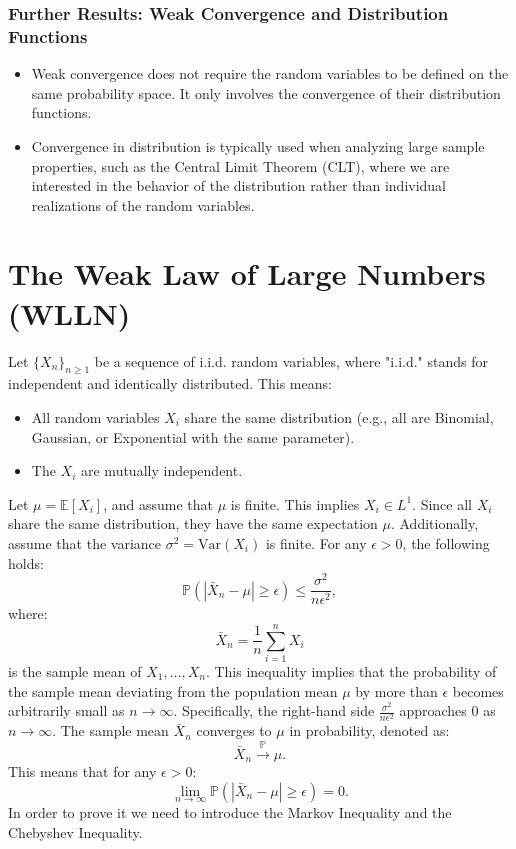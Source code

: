 \subsubsection{Further Results: Weak Convergence and Distribution Functions}

\begin{itemize}
    \item Weak convergence does not require the random variables to be defined on the same probability space. It only involves the convergence of their distribution functions.
    \item Convergence in distribution is typically used when analyzing large sample properties, such as the Central Limit Theorem (CLT), where we are interested in the behavior of the distribution rather than individual realizations of the random variables.
\end{itemize}


\section{The Weak Law of Large Numbers (WLLN)}
Let \( \{X_n\}_{n \geq 1} \) be a sequence of i.i.d. random variables, where "i.i.d." stands for independent and identically distributed. This means:
\begin{itemize}
    \item All random variables \( X_i \) share the same distribution (e.g., all are Binomial, Gaussian, or Exponential with the same parameter).
    \item The \( X_i \) are mutually independent.
\end{itemize}
Let \( \mu = \mathbb{E}[X_i] \), and assume that \( \mu \) is finite. This implies \( X_i \in L^1 \). Since all \( X_i \) share the same distribution, they have the same expectation \( \mu \). Additionally, assume that the variance \( \sigma^2 = \mathrm{Var}(X_i) \) is finite. For any \( \epsilon > 0 \), the following holds:
\[
\mathbb{P}(|\bar{X}_n - \mu| \geq \epsilon) \leq \frac{\sigma^2}{n \epsilon^2},
\]
where:
\[
\bar{X}_n = \frac{1}{n} \sum_{i=1}^n X_i
\]
is the sample mean of \( X_1, \dots, X_n \). \newline
This inequality implies that the probability of the sample mean deviating from the population mean \( \mu \) by more than \( \epsilon \) becomes arbitrarily small as \( n \to \infty \). Specifically, the right-hand side \( \frac{\sigma^2}{n \epsilon^2} \) approaches \( 0 \) as \( n \to \infty \). \newline
The sample mean \( \bar{X}_n \) converges to \( \mu \) in probability, denoted as:
\[
\bar{X}_n \xrightarrow{\mathbb{P}} \mu.
\]
This means that for any \( \epsilon > 0 \):
\[
\lim_{n \to \infty} \mathbb{P}(|\bar{X}_n - \mu| \geq \epsilon) = 0.
\]
In order to prove it we need to introduce the Markov Inequality and the Chebyshev Inequality.
